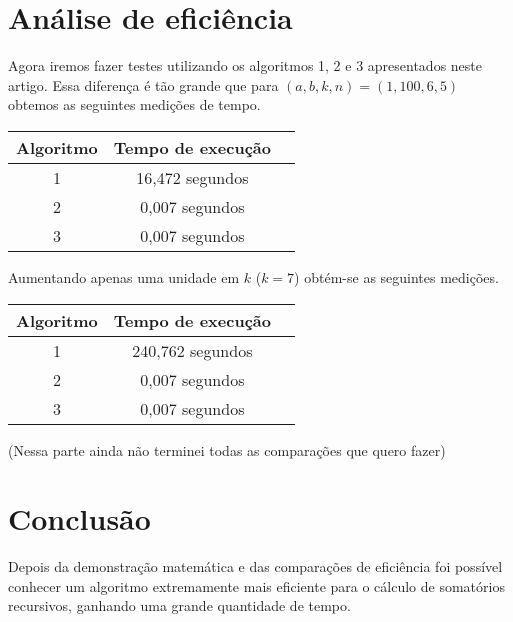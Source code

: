 \documentclass[12pt]{article}
\begin{document}
\vspace{20px}

\section{Análise de eficiência}
\label{analise_de_eficiencia}

Agora iremos fazer testes utilizando os algoritmos 1, 2 e 3 apresentados neste artigo.  Essa diferença é tão grande que para $(a, b, k, n) = (1, 100, 6, 5)$ obtemos as seguintes medições de tempo.

\begin{center}
    \begin{tabular}{ |c|c|c| }
        \hline
        Algoritmo & Tempo de execução \\
        \hline
        1         & 16,472 segundos   \\
        2         & 0,007 segundos    \\
        3         & 0,007 segundos    \\
        \hline
    \end{tabular}
\end{center}

Aumentando apenas uma unidade em $k$ ($k = 7$) obtém-se as seguintes medições.

\begin{center}
    \begin{tabular}{ |c|c|c| }
        \hline
        Algoritmo & Tempo de execução \\
        \hline
        1         & 240,762 segundos  \\
        2         & 0,007 segundos    \\
        3         & 0,007 segundos    \\
        \hline
    \end{tabular}
\end{center}

(Nessa parte ainda não terminei todas as comparações que quero fazer)

\section{Conclusão}

Depois da demonstração matemática e das comparações de eficiência foi possível conhecer um algoritmo extremamente mais eficiente para o cálculo de somatórios recursivos, ganhando uma grande quantidade de tempo.
\end{document}
